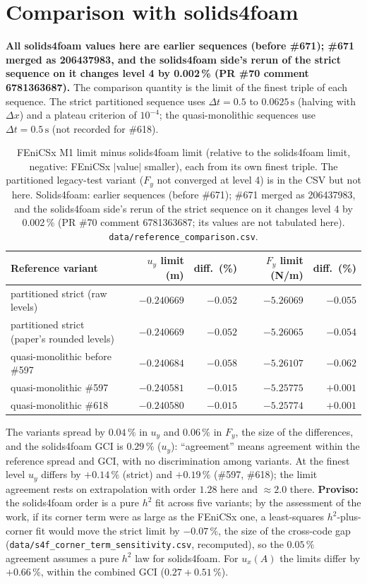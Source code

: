 \documentclass[sn-mathphys,Numbered]{sn-jnl}
\newcommand{\legacy}{\textcolor{red!70!black}{earlier sequences (before \#671); \#671 merged as 206437983, and the solids4foam side's rerun of the strict sequence on it changes level 4 by 0.002\,\% (PR \#70 comment 6781363687)}}
\begin{document}
\section{Comparison with solids4foam}\label{sec:cv_ref}
\textbf{All solids4foam values here are \legacy.} The comparison quantity is the limit of the finest triple of each sequence. The strict partitioned sequence uses $\Delta t=0.5$ to $0.0625\,\mathrm s$ (halving with $\Delta x$) and a plateau criterion of $10^{-4}$; the quasi-monolithic sequences use $\Delta t=0.5\,\mathrm s$ (not recorded for \#618).
\begin{table}[htbp]
\centering
\caption{FEniCSx M1 limit minus solids4foam limit (relative to the solids4foam limit, negative: FEniCSx $|$value$|$ smaller), each from its own finest triple. The partitioned legacy-test variant ($F_y$ not converged at level 4) is in the CSV but not here. Solids4foam: earlier sequences (before \#671); \#671 merged as 206437983, and the solids4foam side's rerun of the strict sequence on it changes level 4 by 0.002\,\% (PR \#70 comment 6781363687; its values are not tabulated here). \texttt{data/reference\_comparison.csv}.}\label{tab:cv_ref}
\small
\begin{tabular}{@{}p{5.3cm}rrrr@{}}
\toprule
Reference variant & $u_y$ limit (m) & diff.\ (\%) & $F_y$ limit (N/m) & diff.\ (\%) \\
\midrule
partitioned strict (raw levels) & $-0.240669$ & $-0.052$ & $-5.26069$ & $-0.055$ \\
partitioned strict (paper's rounded levels) & $-0.240669$ & $-0.052$ & $-5.26065$ & $-0.054$ \\
quasi-monolithic before \#597 & $-0.240684$ & $-0.058$ & $-5.26107$ & $-0.062$ \\
quasi-monolithic \#597 & $-0.240581$ & $-0.015$ & $-5.25775$ & $+0.001$ \\
quasi-monolithic \#618 & $-0.240580$ & $-0.015$ & $-5.25774$ & $+0.001$ \\
\bottomrule
\end{tabular}
\end{table}
The variants spread by $0.04\,\%$ in $u_y$ and $0.06\,\%$ in $F_y$, the size of the differences, and the solids4foam GCI is $0.29\,\%$ ($u_y$): ``agreement'' means agreement within the reference spread and GCI, with no discrimination among variants. At the finest level $u_y$ differs by $+0.14\,\%$ (strict) and $+0.19\,\%$ (\#597, \#618); the limit agreement rests on extrapolation with order $1.28$ here and $\approx2.0$ there. \textbf{Proviso:} the solids4foam order is a pure $h^2$ fit across five variants; by the assessment of the work, if its corner term were as large as the FEniCSx one, a least-squares $h^2$-plus-corner fit would move the strict limit by $-0.07\,\%$, the size of the cross-code gap (\texttt{data/s4f\_corner\_term\_sensitivity.csv}, recomputed), so the $0.05\,\%$ agreement assumes a pure $h^2$ law for solids4foam. For $u_x(A)$ the limits differ by $+0.66\,\%$, within the combined GCI ($0.27+0.51\,\%$).
\end{document}
